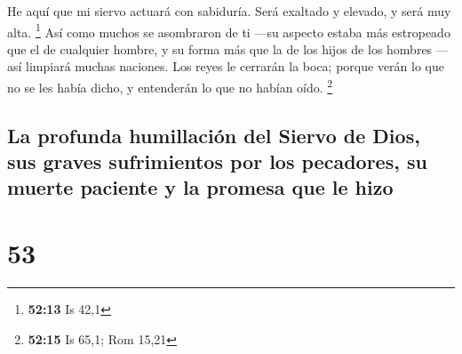  He aquí que mi siervo actuará con sabiduría. Será
exaltado y elevado, y será muy alta. \footnote{\textbf{52:13} Is 42,1}
 Así como muchos se asombraron de ti ---su aspecto estaba
más estropeado que el de cualquier hombre, y su forma más que la de los
hijos de los hombres ---  así limpiará muchas naciones.
Los reyes le cerrarán la boca; porque verán lo que no se les había
dicho, y entenderán lo que no habían oído. \footnote{\textbf{52:15} Is
  65,1; Rom 15,21}

\hypertarget{la-profunda-humillaciuxf3n-del-siervo-de-dios-sus-graves-sufrimientos-por-los-pecadores-su-muerte-paciente-y-la-promesa-que-le-hizo}{%
\subsection{La profunda humillación del Siervo de Dios, sus graves
sufrimientos por los pecadores, su muerte paciente y la promesa que le
hizo}\label{la-profunda-humillaciuxf3n-del-siervo-de-dios-sus-graves-sufrimientos-por-los-pecadores-su-muerte-paciente-y-la-promesa-que-le-hizo}}

\hypertarget{section-52}{%
\section{53}\label{section-52}}

